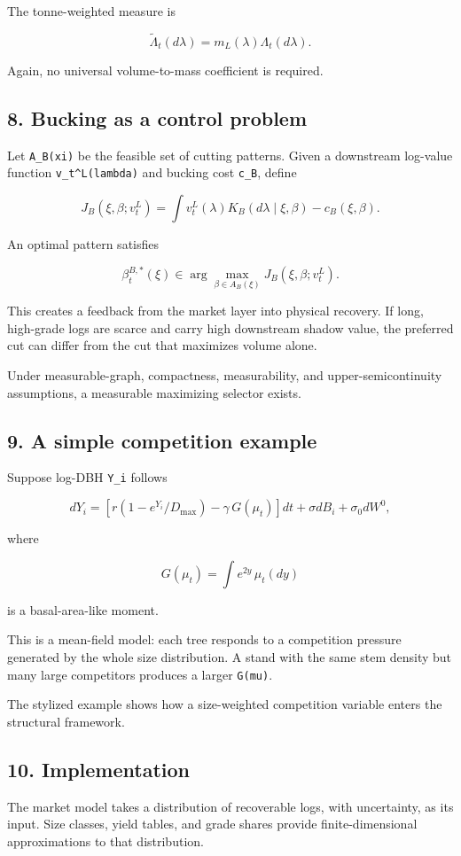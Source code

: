The tonne-weighted measure is

\[
\widetilde\Lambda_t(d\lambda)=m_L(\lambda)\Lambda_t(d\lambda).
\]

Again, no universal volume-to-mass coefficient is required.

\subsection{8. Bucking as a control problem}\label{bucking-as-a-control-problem}

Let \texttt{A\_B(xi)} be the feasible set of cutting patterns. Given a downstream
log-value function \texttt{v\_t\^{}L(lambda)} and bucking cost \texttt{c\_B}, define

\[
J_B(\xi,\beta;v_t^L)
=\int v_t^L(\lambda)K_B(d\lambda\mid\xi,\beta)-c_B(\xi,\beta).
\]

An optimal pattern satisfies

\[
\beta_t^{B,*}(\xi)\in\arg\max_{\beta\in A_B(\xi)}J_B(\xi,\beta;v_t^L).
\]

This creates a feedback from the market layer into physical recovery. If long,
high-grade logs are scarce and carry high downstream shadow value, the preferred
cut can differ from the cut that maximizes volume alone.

Under measurable-graph, compactness, measurability, and upper-semicontinuity
assumptions, a measurable maximizing selector exists.

\subsection{9. A simple competition example}\label{a-simple-competition-example}

Suppose log-DBH \texttt{Y\_i} follows

\[
dY_i=\left[r(1-e^{Y_i}/D_{\max})
-\gamma\,G(\mu_t)\right]dt+\sigma dB_i+\sigma_0dW^0,
\]

where

\[
G(\mu_t)=\int e^{2y}\,\mu_t(dy)
\]

is a basal-area-like moment.

This is a mean-field model: each tree responds to a competition pressure generated
by the whole size distribution. A stand with the
same stem density but many large competitors produces a larger \texttt{G(mu)}.

The stylized example shows how a size-weighted competition variable enters the
structural framework.

\subsection{10. Implementation}\label{implementation}

The market model takes a distribution of recoverable logs, with uncertainty, as
its input. Size classes, yield tables, and grade shares provide finite-dimensional
approximations to that distribution.
